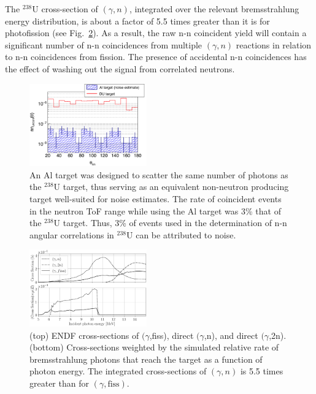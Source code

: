 \documentclass[%
 reprint,
 amsmath,amssymb,
 aps,
 nofootinbib
]{revtex4-1}
\begin{document}
The $^{238}$U cross-section of $(\gamma, n)$, integrated over the relevant bremsstrahlung energy distribution, is about a factor of 5.5 times greater than it is for photofission (see Fig.~\ref{fig:CrossSection}).
As a result, the raw n-n coincident yield will contain a significant number of n-n coincidences from multiple $(\gamma, n)$ reactions in relation to n-n coincidences from fission.
The presence of accidental n-n coincidences has the effect of washing out the signal from correlated neutrons. 
\begin{figure}[]
\centering
    \includegraphics[width=0.45\textwidth]{Noise.png}
    \caption{An Al target was designed to scatter the same number of photons as the $^{238}$U target, thus serving as an equivalent non-neutron producing target well-suited for noise estimates.
    The rate of coincident events in the neutron ToF range while using the Al target was 3\% that of the $^{238}$U target.
    Thus, 3\% of events used in the determination of n-n angular correlations in $^{238}$U can be attributed to noise.
        }
    \label{fig:Noise}
\end{figure}
\begin{figure}[]
\centering
    \includegraphics[width=0.45\textwidth]{CrossSections.png}
    \caption{(top) ENDF cross-sections of $(\gamma$,fiss), direct $(\gamma$,n), and direct $(\gamma$,2n).
    (bottom) Cross-sections weighted by the simulated relative rate of bremsstrahlung photons that reach the target as a function of photon energy. The integrated cross-sections of $(\gamma, n)$ is 5.5 times greater than for $(\gamma, \text{fiss})$. }
    \label{fig:CrossSection}
\end{figure}
\end{document}
